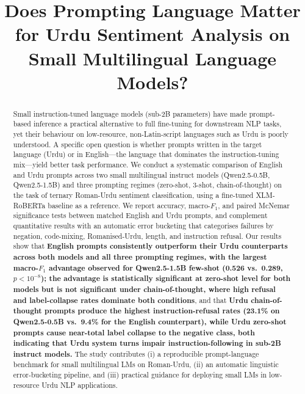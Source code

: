 \documentclass[conference]{IEEEtran}
\begin{document}
\title{Does Prompting Language Matter for Urdu Sentiment Analysis on Small Multilingual Language Models?}

\author{
}

\maketitle

\begin{abstract}
Small instruction-tuned language models (sub-2B parameters) have made
prompt-based inference a practical alternative to full fine-tuning for
downstream NLP tasks, yet their behaviour on low-resource, non-Latin-script
languages such as Urdu is poorly understood. A specific open question is
whether prompts written in the target language (Urdu) or in English---the
language that dominates the instruction-tuning mix---yield better task
performance. We conduct a systematic comparison of English and Urdu prompts
across two small multilingual instruct models (Qwen2.5-0.5B, Qwen2.5-1.5B)
and three prompting regimes (zero-shot, 3-shot, chain-of-thought) on the
task of ternary Roman-Urdu sentiment classification, using a fine-tuned
XLM-RoBERTa baseline as a reference. We report accuracy, macro-$F_1$, and
paired McNemar significance tests between matched English and Urdu prompts,
and complement quantitative results with an automatic error bucketing that
categorises failures by negation, code-mixing, Romanised-Urdu, length, and
instruction refusal. Our results show that \textbf{English prompts
consistently outperform their Urdu counterparts across both models and all
three prompting regimes, with the largest macro-$F_1$ advantage observed
for Qwen2.5-1.5B few-shot (0.526 vs.\ 0.289, $p<10^{-8}$); the advantage
is statistically significant at zero-shot level for both models but is not
significant under chain-of-thought, where high refusal and label-collapse
rates dominate both conditions}, and that \textbf{Urdu
chain-of-thought prompts produce the highest instruction-refusal rates
(23.1\% on Qwen2.5-0.5B vs.\ 9.4\% for the English counterpart), while
Urdu zero-shot prompts cause near-total label collapse to the negative class,
both indicating that Urdu system turns impair instruction-following in
sub-2B instruct models.} The study contributes (i) a reproducible
prompt-language benchmark for small multilingual LMs on Roman-Urdu,
(ii) an automatic linguistic error-bucketing pipeline, and (iii) practical
guidance for deploying small LMs in low-resource Urdu NLP applications.
\end{abstract}
\end{document}

